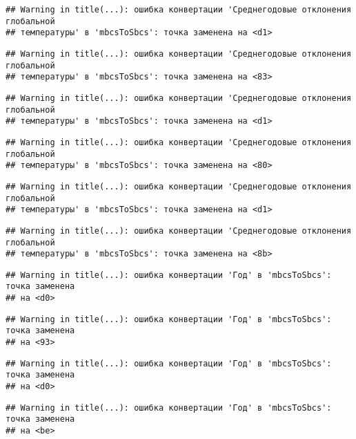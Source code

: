 \documentclass[
]{article}
\begin{document}
\begin{verbatim}
## Warning in title(...): ошибка конвертации 'Среднегодовые отклонения глобальной
## температуры' в 'mbcsToSbcs': точка заменена на <d1>
\end{verbatim}

\begin{verbatim}
## Warning in title(...): ошибка конвертации 'Среднегодовые отклонения глобальной
## температуры' в 'mbcsToSbcs': точка заменена на <83>
\end{verbatim}

\begin{verbatim}
## Warning in title(...): ошибка конвертации 'Среднегодовые отклонения глобальной
## температуры' в 'mbcsToSbcs': точка заменена на <d1>
\end{verbatim}

\begin{verbatim}
## Warning in title(...): ошибка конвертации 'Среднегодовые отклонения глобальной
## температуры' в 'mbcsToSbcs': точка заменена на <80>
\end{verbatim}

\begin{verbatim}
## Warning in title(...): ошибка конвертации 'Среднегодовые отклонения глобальной
## температуры' в 'mbcsToSbcs': точка заменена на <d1>
\end{verbatim}

\begin{verbatim}
## Warning in title(...): ошибка конвертации 'Среднегодовые отклонения глобальной
## температуры' в 'mbcsToSbcs': точка заменена на <8b>
\end{verbatim}

\begin{verbatim}
## Warning in title(...): ошибка конвертации 'Год' в 'mbcsToSbcs': точка заменена
## на <d0>
\end{verbatim}

\begin{verbatim}
## Warning in title(...): ошибка конвертации 'Год' в 'mbcsToSbcs': точка заменена
## на <93>
\end{verbatim}

\begin{verbatim}
## Warning in title(...): ошибка конвертации 'Год' в 'mbcsToSbcs': точка заменена
## на <d0>
\end{verbatim}

\begin{verbatim}
## Warning in title(...): ошибка конвертации 'Год' в 'mbcsToSbcs': точка заменена
## на <be>
\end{verbatim}
\end{document}
